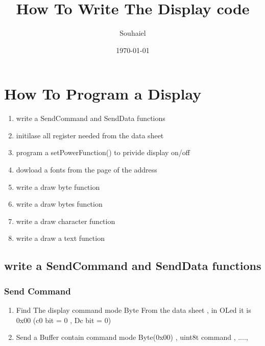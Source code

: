 \documentclass[11pt]{article}
\title{How To Write The Display code}
\author{Souhaiel}
\date{\today}
\begin{document}
\maketitle
\tableofcontents
\vspace{10cm}
\section{How To Program a Display}
\begin{enumerate}
\item write a SendCommand and SendData functions
\item initilase all register needed from the data sheet
\item program a setPowerFunction() to privide display on/off
\item dowload a fonts from the page of the address
\item write a draw byte function 
\item write a draw bytes function
\item write a draw character function
\item write a draw a text function
\end{enumerate}

\subsection{write a SendCommand and SendData functions}
\subsubsection{Send Command}
\begin{enumerate}
\item Find The display command mode Byte From the data sheet , in OLed it is 0x00 (c0 bit = 0 , Dc bit = 0)

\item Send a Buffer contain {command mode Byte(0x00) , uint8t command , ....,}
\end{enumerate}

\vspace{2cm}
\end{document}

